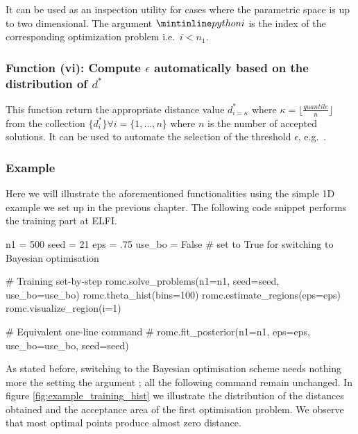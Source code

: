 It can be used as an inspection utility for cases where the parametric
space is up to two dimensional. The argument $\pinline{i}$ is the
index of the corresponding optimization problem i.e.\ $i<n_1$.

\subsubsection*{Function (vi): Compute $\epsilon$ automatically based on the distribution of $d^*$}

\vspace{5mm}
\noindent

\noindent
This function return the appropriate distance value $d_{i=\kappa}^*$
where $\kappa = \lfloor \frac{quantile}{n} \rfloor$ from the
collection $\{ d_i^* \} \forall i = \{1, \ldots, n\}$ where $n$ is the
number of accepted solutions. It can be used to automate the selection
of the threshold $\epsilon$, e.g.\
.


\subsubsection*{Example}

Here we will illustrate the aforementioned functionalities using the
simple 1D example we set up in the previous chapter. The following
code snippet performs the training part at ELFI.

\begin{pythoncode}
  n1 = 500
  seed = 21
  eps = .75
  use_bo = False # set to True for switching to Bayesian optimisation

  # Training set-by-step
  romc.solve_problems(n1=n1, seed=seed, use_bo=use_bo)
  romc.theta_hist(bins=100)
  romc.estimate_regions(eps=eps)
  romc.visualize_region(i=1)

  # Equivalent one-line command
  # romc.fit_posterior(n1=n1, eps=eps, use_bo=use_bo, seed=seed)
\end{pythoncode}

As stated before, switching to the Bayesian optimisation scheme needs
nothing more the setting the argument \pinline{use_bo=True}; all the
following command remain unchanged. In figure
\ref{fig:example_training_hist} we illustrate the distribution of the
distances obtained and the acceptance area of the first optimisation
problem. We observe that most optimal points produce almost zero
distance.

